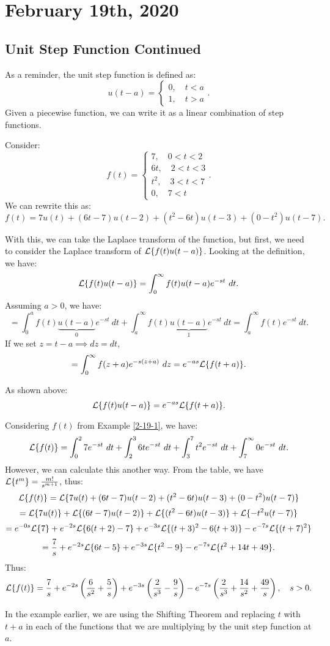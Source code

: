 \documentclass[../main/main.tex]{subfiles}
\begin{document}
\section{February 19th, 2020}
\subsection{Unit Step Function Continued}
As a reminder, the unit step function is defined as: \[
	u(t-a) = \begin{cases}
		0,\quad t<a \\
		1,\quad t>a
	\end{cases}
.\] Given a piecewise function, we can write it as a linear combination of step functions. 
\begin{example} \label{2-19-1}
	Consider: \[
		f(t) = \begin{cases}
			7,\quad 0 < t < 2 \\
			6t,\quad 2 < t < 3\\
			t^2, \quad 3 < t < 7 \\
			0, \quad 7 < t
		\end{cases} 
	.\] We can rewrite this as: \[
	f(t) = 7u(t) + (6t-7)u(t-2) + (t^2-6t) u(t-3) + (0-t^2)u(t-7)
	.\] 
\end{example}
With this, we can take the Laplace transform of the function, but first, we need to consider the Laplace transform of $\mathcal{L} \{f(t) u(t-a)\} $. Looking at the definition, we have: \[
	\mathcal{L} \{f(t) u(t-a)\} = \int^\infty_0 f(t) u(t-a) e^{-st}~dt
.\] Assuming $a> 0$, we have: \[
= \int^a_0 f(t) \underbrace{u(t-a)}_0 e^{-st}~dt + \int^\infty_a f(t) \underbrace{u(t-a)}_1 e^{-st}~dt = \int^\infty_a f(t) e^{-st}~dt
.\] If we set $z=t-a \implies dz = dt$, \[
= \int_0^\infty f(z+a) e^{-s(z+a)}~dz = e^{-as}\mathcal{L} \{f(t+a)\} 
.\] 
\begin{theorem}
	As shown above: \[
		\mathcal{L} \{f(t) u(t-a)\} =e^{-as}\mathcal{L} \{f(t+a)\} 
	.\] 
\end{theorem}
\begin{example}
	Considering $f(t)$ from Example \ref{2-19-1}, we have: \[
		\mathcal{L} \{f(t)\} = \int^2_0 7 e^{-st}~dt + \int^3_2 6t e^{-st}~dt + \int^7_3 t^2e^{-st}~dt + \int^\infty_7 0 e^{-st}~dt
	.\] However, we can calculate this another way. From the table, we have $\mathcal{L} \{t ^{m}\} = \frac{m!}{s^{m+1}}$, thus: \[
	\mathcal{L} \{f(t)\} = \mathcal{L} \{7u(t) + (6t-7)u(t-2) + (t^2-6t)u(t-3) + (0-t^2)u(t-7)\} 
	\] \[
	=\mathcal{L} \{7u(t)\} + \mathcal{L} \{(6t-7)u(t-2)\} +\mathcal{L} \{(t ^2-6t)u(t-3)\} +\mathcal{L} \{-t^2u(t-7)\} 
	\] \[
	= e^{-0s}\mathcal{L} \{ 7\} + e^{-2s}\mathcal{L} \{6(t+2)-7\} + e^{-3s}\mathcal{L} \{(t+3)^2-6(t+3)\} -e^{-7s}\mathcal{L} \{(t+7)^2\}  
	\] \[
	= \frac{7}{s}+e^{-2s}\mathcal{L} \{6t-5\} +e^{-3s}\mathcal{L} \{t^2-9\} -e^{-7s}\mathcal{L} \{t^2+14t+49\} 
	.\] Thus: \[
	\mathcal{L} \{f(t)\} =\frac{7}{s}+e^{-2s}\left( \frac{6}{s^2}+\frac{5}{s} \right) + e^{-3s}\left( \frac{2}{s^{3}}-\frac{9}{s} \right) -e^{-7s}\left( \frac{2}{s^{3}}+\frac{14}{s^2}+\frac{49}{s} \right) ,\quad s>0
	.\]  
\end{example}
\begin{remark}
	In the example earlier, we are using the Shifting Theorem and replacing $t$ with $t+a$ in each of the functions that we are multiplying by the unit step function at  $a$.
\end{remark}
\end{document}
